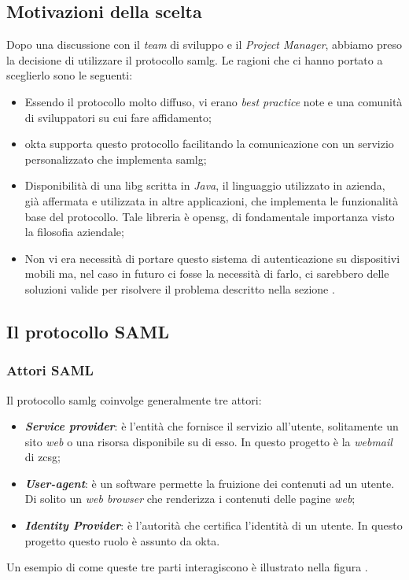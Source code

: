 \subsection{Motivazioni della scelta}
Dopo una discussione con il \textit{team} di sviluppo e il \textit{Project Manager}, abbiamo preso la decisione di utilizzare il protocollo \gls{samlg}. Le ragioni che ci hanno portato a sceglierlo sono le seguenti:
\begin{itemize}
    \item Essendo il protocollo molto diffuso, vi erano \textit{best practice} note e una comunità di sviluppatori su cui fare affidamento;
    \item \gls{okta} supporta questo protocollo facilitando la comunicazione con un servizio personalizzato che implementa \gls{samlg};
    \item Disponibilità di una \gls{libg} scritta in \textit{Java}, il linguaggio utilizzato in azienda, già affermata e utilizzata in altre applicazioni, che implementa le funzionalità base del protocollo. Tale libreria è \gls{opensg}, di fondamentale importanza visto la filosofia aziendale;
    \item Non vi era necessità di portare questo sistema di autenticazione su dispositivi mobili ma, nel caso in futuro ci fosse la necessità di farlo, ci sarebbero delle soluzioni valide per risolvere il problema descritto nella sezione .
\end{itemize}

\newpage

\subsection{Il protocollo SAML}
\subsubsection{Attori SAML}
Il protocollo \gls{samlg} coinvolge generalmente tre attori:
\begin{itemize}
    \item \textit{\textbf{Service provider}}: è l'entità che fornisce il servizio all'utente, solitamente un sito \textit{web} o una risorsa disponibile su di esso. In questo progetto è la \textit{webmail} di \gls{zcsg};
    \item \textit{\textbf{User-agent}}: è un software permette la fruizione dei contenuti ad un utente. Di solito un \textit{web browser} che renderizza i contenuti delle pagine \textit{web};
    \item \textit{\textbf{Identity Provider}}: è l'autorità che certifica l'identità di un utente. In questo progetto questo ruolo è assunto da \gls{okta}.
\end{itemize}
Un esempio di come queste tre parti interagiscono è illustrato nella figura .

